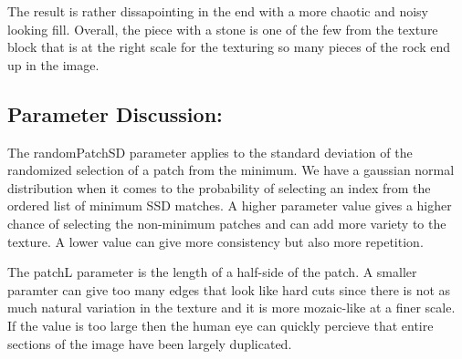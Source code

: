 \documentclass[12pt]{article}
\begin{document}
The result is rather dissapointing in the end with a more chaotic and noisy looking fill.
Overall, the piece with a stone is one of the few from the texture block that is at the right scale for the texturing so many pieces of the rock end up in the image.

\subsection*{Parameter Discussion:}

The randomPatchSD parameter applies to the standard deviation of the randomized selection of a patch from the minimum. We have a gaussian normal distribution when it comes to the probability of selecting an index from the ordered list of minimum SSD matches. A higher parameter value gives a higher chance of selecting the non-minimum patches and can add more variety to the texture. A lower value can give more consistency but also more repetition.

The patchL parameter is the length of a half-side of the patch. A smaller paramter can give too many edges that look like hard cuts since there is not as much natural variation in the texture and it is more mozaic-like at a finer scale. If the value is too large then the human eye can quickly percieve that entire sections of the image have been largely duplicated.
\end{document}
